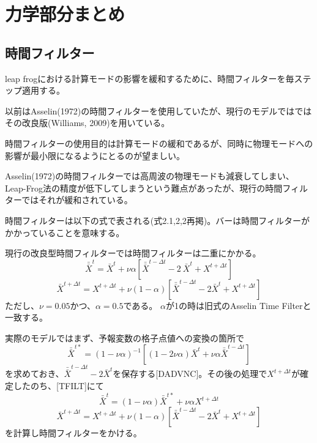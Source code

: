 \documentclass{jsbook}
\begin{document}
\section{力学部分まとめ}
\subsection{時間フィルター}
leap frogにおける計算モードの影響を緩和するために、時間フィルターを毎ステップ適用する。

以前はAsselin(1972)の時間フィルターを使用していたが、現行のモデルではではその改良版(Williams, 2009)を用いている。

時間フィルターの使用目的は計算モードの緩和であるが、同時に物理モードへの影響が最小限になるようにとるのが望ましい。

Asselin(1972)の時間フィルターでは高周波の物理モードも減衰してしまい、Leap-Frog法の精度が低下してしまうという難点があったが、現行の時間フィルターではそれが緩和されている。

時間フィルターは以下の式で表される(式2.1,2,2再掲)。バーは時間フィルターがかかっていることを意味する。

現行の改良型時間フィルターでは時間フィルターは二重にかかる。
\begin{equation}
\bar{\bar{X}}^{t} = \bar{X}^{t} + \nu \alpha [\bar{\bar{X}}^{t-\Delta t} - 2 \
\bar{X}^{t} + X^{t+\Delta t}] 
\end{equation}
\begin{equation}
\bar{X}^{t+\Delta t} = X^{t+\Delta t} + \nu (1-\alpha) [\bar{\bar{X}}^{t-\Delta t} - 2 \bar{X}^{t} + X^{t+\Delta t}] 
\end{equation}
ただし、$\nu=0.05$かつ、$\alpha=0.5$である。
$\alpha$が1の時は旧式のAsselin Time Filterと一致する。

実際のモデルではまず、予報変数の格子点値への変換の箇所で
\begin{equation}
\bar{\bar{X}}^{t\ast}=(1-\nu \alpha)^{-1}[(1-2 \nu \alpha)\bar{X}^{t}+\nu \alpha \bar{\bar{X}}^{t-\Delta t}] 
\end{equation}
を求めておき、$\bar{\bar{X}}^{t-\Delta t}-2\bar{X}^{t}$を保存する[DADVNC]。その後の処理で$X^{t+\Delta t}$が確定したのち、[TFILT]にて
\begin{equation}
\bar{\bar{X}}^{t} = (1-\nu \alpha) \bar{\bar{X}}^{t\ast}+\nu \alpha X^{t+\Delta t} 
\end{equation}
\begin{equation}
\bar{X}^{t+\Delta t} = X^{t+\Delta t} + \nu (1-\alpha) [\bar{\bar{X}}^{t-\Delta t} - 2 \bar{X}^{t} + X^{t+\Delta t}]  
\end{equation}
を計算し時間フィルターをかける。
\end{document}
